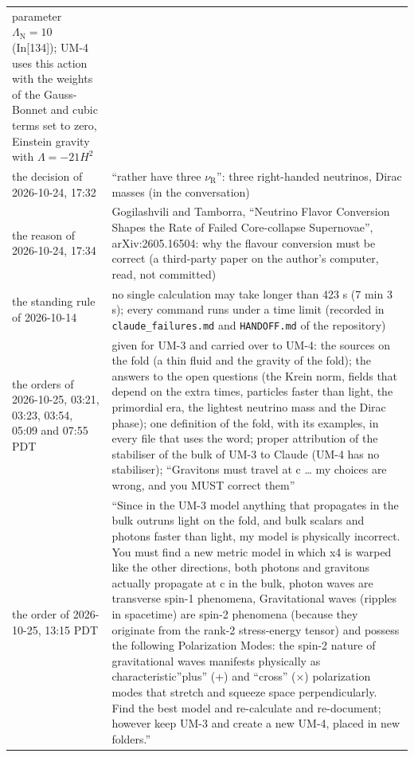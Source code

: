 \documentclass[
  10pt,
]{article}
\begin{document}
\begin{longtable}[]{@{}
  >{\raggedright\arraybackslash}p{}
  >{\raggedright\arraybackslash}p{}@{}}
parameter \(\Lambda_{\mathrm{N}} = 10\) (In{[}134{]}); UM-4 uses this
action with the weights of the Gauss-Bonnet and cubic terms set to zero,
Einstein gravity with \(\Lambda = -21H^2\) \\
the decision of 2026-10-24, 17:32 & ``rather have three
\(\nu_{\mathrm{R}}\)'': three right-handed neutrinos, Dirac masses (in
the conversation) \\
the reason of 2026-10-24, 17:34 & Gogilashvili and Tamborra, ``Neutrino
Flavor Conversion Shapes the Rate of Failed Core-collapse Supernovae'',
arXiv:2605.16504: why the flavour conversion must be correct (a
third-party paper on the author's computer, read, not committed) \\
the standing rule of 2026-10-14 & no single calculation may take longer
than 423 s (7 min 3 s); every command runs under a time limit (recorded
in \texttt{claude\_failures.md} and \texttt{HANDOFF.md} of the
repository) \\
the orders of 2026-10-25, 03:21, 03:23, 03:54, 05:09 and 07:55 PDT &
given for UM-3 and carried over to UM-4: the sources on the fold (a thin
fluid and the gravity of the fold); the answers to the open questions
(the Krein norm, fields that depend on the extra times, particles faster
than light, the primordial era, the lightest neutrino mass and the Dirac
phase); one definition of the fold, with its examples, in every file
that uses the word; proper attribution of the stabiliser of the bulk of
UM-3 to Claude (UM-4 has no stabiliser); ``Gravitons must travel at c
\ldots{} my choices are wrong, and you MUST correct them'' \\
the order of 2026-10-25, 13:15 PDT & ``Since in the UM-3 model anything
that propagates in the bulk outruns light on the fold, and bulk scalars
and photons faster than light, my model is physically incorrect. You
must find a new metric model in which x4 is warped like the other
directions, both photons and gravitons actually propagate at c in the
bulk, photon waves are transverse spin-1 phenomena, Gravitational waves
(ripples in spacetime) are spin-2 phenomena (because they originate from
the rank-2 stress-energy tensor) and possess the following Polarization
Modes: the spin-2 nature of gravitational waves manifests physically as
characteristic''plus'' (+) and ``cross'' (×) polarization modes that
stretch and squeeze space perpendicularly. Find the best model and
re-calculate and re-document; however keep UM-3 and create a new UM-4,
placed in new folders.'' \\
\end{longtable}
\end{document}
